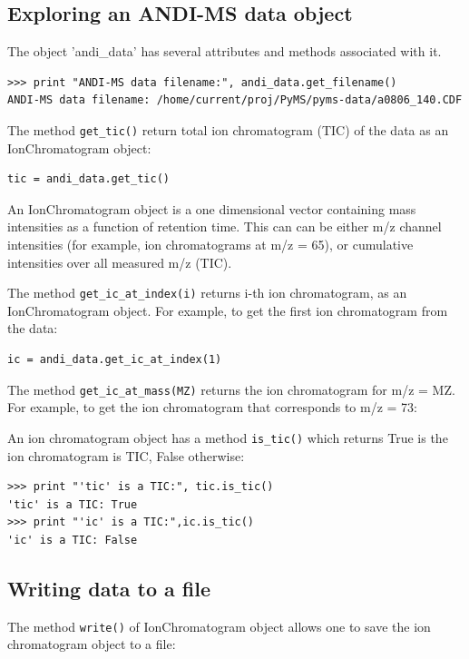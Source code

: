 \subsection{Exploring an ANDI-MS data object}

The object 'andi\_data' has several attributes and methods associated with it.

\begin{verbatim}
>>> print "ANDI-MS data filename:", andi_data.get_filename()
ANDI-MS data filename: /home/current/proj/PyMS/pyms-data/a0806_140.CDF
\end{verbatim}

The method {\tt get\_tic()} return total ion chromatogram (TIC) of the data
as an IonChromatogram object:

\begin{verbatim}
tic = andi_data.get_tic()
\end{verbatim}

\noindent
An IonChromatogram object is a one dimensional vector containing
mass intensities as a function of retention time. This can can be either
m/z channel intensities (for example, ion chromatograms at m/z = 65),
or cumulative intensities over all measured m/z (TIC).

The method {\tt get\_ic\_at\_index(i)} returns i-th ion chromatogram, as
an IonChromatogram object. For example, to get the first ion chromatogram
from the data:

\begin{verbatim}
ic = andi_data.get_ic_at_index(1)
\end{verbatim}

The method {\tt get\_ic\_at\_mass(MZ)} returns the ion chromatogram for
m/z = MZ.  For example, to get the ion chromatogram that corresponds
to m/z = 73:

An ion chromatogram object has a method {\tt is\_tic()} which returns
True is the ion chromatogram is TIC, False otherwise:

\begin{verbatim}
>>> print "'tic' is a TIC:", tic.is_tic()
'tic' is a TIC: True
>>> print "'ic' is a TIC:",ic.is_tic()
'ic' is a TIC: False
\end{verbatim}

\subsection{Writing data to a file}

The method {\tt write()} of IonChromatogram object allows one to save
the ion chromatogram object to a file:

